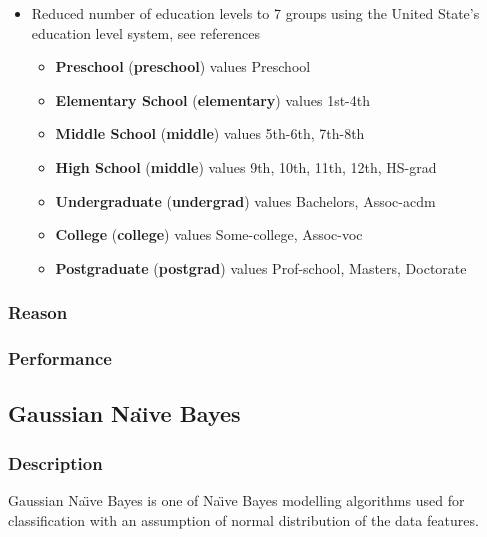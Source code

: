 \documentclass[12pt]{article}
\begin{document}
\begin{itemize}
		\item Reduced number of education levels to 7 groups using the United State's education level system, see references
		\begin{itemize}
			\item {\bfseries Preschool} ({\bfseries preschool}) values Preschool\cite{education-level}
			\item {\bfseries Elementary School} ({\bfseries elementary}) values 1st-4th\cite{education-level}
			\item {\bfseries Middle School} ({\bfseries middle}) values 5th-6th, 7th-8th\cite{education-level}
			\item {\bfseries High School} ({\bfseries middle}) values 9th, 10th, 11th, 12th, HS-grad\cite{education-level}
			\item {\bfseries Undergraduate} ({\bfseries undergrad}) values Bachelors\cite{undergrad}, Assoc-acdm\cite{associate-degree}
			\item {\bfseries College} ({\bfseries college}) values Some-college\cite{difference-between-education-levels}, Assoc-voc\cite{vocational-school}
			\item {\bfseries Postgraduate} ({\bfseries postgrad}) values Prof-school, Masters, Doctorate\cite{postgrad}
		\end{itemize}
	\end{itemize}

	\subsubsection{Reason}
	\subsubsection{Performance}
	\newpage
	
	\subsection{Gaussian Na\"{\i}ve Bayes}
	\subsubsection{Description}
	Gaussian Na\"{\i}ve Bayes is one of Na\"{\i}ve Bayes modelling algorithms used for classification with an assumption of normal distribution of the data features.
\end{document}
